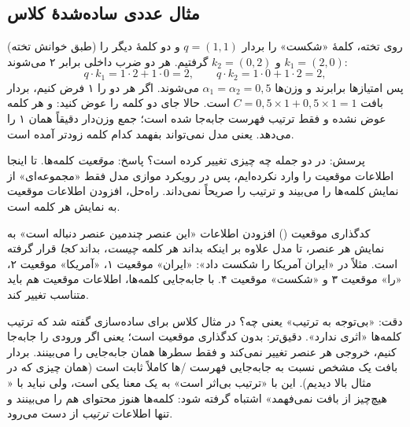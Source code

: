 \subsection{مثال عددی ساده‌شدهٔ کلاس}
روی تخته،  کلمهٔ «شکست» را بردار $q=(1,1)$ و  دو کلمهٔ دیگر را (طبق خوانش تخته) $k_{1}=(2,0)$ و $k_{2}=(0,2)$ گرفتیم. هر دو ضرب داخلی برابر ۲ می‌شوند:
\[
q\cdot k_1 = 1\cdot 2+1\cdot 0 = 2,\qquad q\cdot k_2 = 1\cdot 0+1\cdot 2 = 2 ,
\]
پس امتیازها برابرند و وزن‌ها $\alpha_1=\alpha_2=0{,}5$ می‌شوند. اگر  هر دو را ۱ فرض کنیم، بردار بافت $C = 0{,}5\times 1 + 0{,}5\times 1 = 1$ است. حالا جای دو کلمه را عوض کنید:  و  هر کلمه عوض نشده و فقط ترتیب فهرست جابه‌جا شده است؛ جمع وزن‌دار دقیقاً همان ۱ را می‌دهد. یعنی مدل نمی‌تواند بفهمد کدام کلمه زودتر آمده است.

پرسش: در دو جمله چه چیزی تغییر کرده است؟ پاسخ: \emph{موقعیت} کلمه‌ها. تا اینجا اطلاعات موقعیت را وارد  نکرده‌ایم، پس در رویکرد موازی مدل فقط «مجموعه‌ای» از نمایش کلمه‌ها را می‌بیند و ترتیب را صریحاً نمی‌داند. راه‌حل، افزودن اطلاعات موقعیت به نمایش هر کلمه است.

\begin{definitionbox}{کدگذاری موقعیت ()}
افزودن اطلاعات «این عنصر چندمین عنصر دنباله است» به نمایش هر عنصر، تا مدل علاوه بر اینکه بداند هر کلمه \emph{چیست}، بداند \emph{کجا} قرار گرفته است. مثلاً در «ایران آمریکا را شکست داد»: «ایران» موقعیت ۱، «آمریکا» موقعیت ۲، «را» موقعیت ۳ و «شکست» موقعیت ۴. با جابه‌جایی کلمه‌ها، اطلاعات موقعیت هم باید متناسب تغییر کند.
\end{definitionbox}

\begin{correctionbox}{دقت: «بی‌توجه به ترتیب» یعنی چه؟}
در مثال کلاس برای ساده‌سازی گفته شد که ترتیب کلمه‌ها «اثری ندارد». دقیق‌تر:  بدون کدگذاری موقعیت  است؛ یعنی اگر ورودی را جابه‌جا کنیم، خروجی هر عنصر تغییر نمی‌کند و فقط سطرها همان جابه‌جایی را می‌بینند. بردار بافت یک  مشخص نسبت به جابه‌جایی فهرست /ها کاملاً ثابت است (همان چیزی که در مثال بالا دیدیم). این با «ترتیب بی‌اثر است» به یک معنا یکی است، ولی نباید با « هیچ‌چیز از بافت نمی‌فهمد» اشتباه گرفته شود: کلمه‌ها هنوز محتوای هم را می‌بینند و تنها اطلاعات \emph{ترتیب} از دست می‌رود.
\end{correctionbox}

